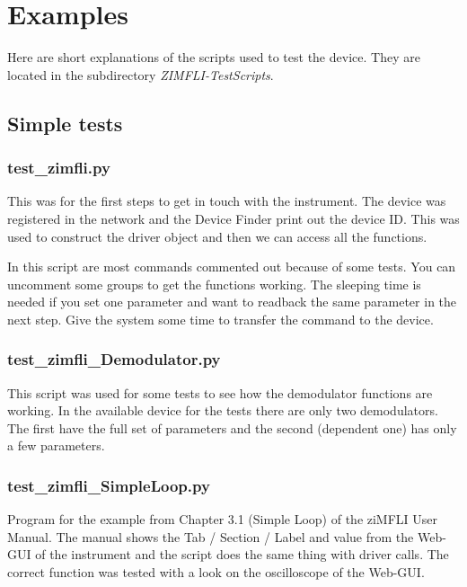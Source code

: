 \documentclass[11pt]{article} %
\begin{document}
            
            

\clearpage

\section{Examples}

Here are short explanations of the scripts used to test the device. They are located in the subdirectory {\it ZIMFLI-TestScripts}.


\subsection{Simple tests}

\subsubsection{test\_zimfli.py}
This was for the first steps to get in touch with the instrument. The device was registered in the network and the Device Finder print out the device ID. This was used to construct the driver object and then we can access all the functions.

In this script are most commands commented out because of some tests. You can uncomment some groups to get the functions working. The sleeping time is needed if you set one parameter and want to readback the same parameter in the next step. Give the system some time to transfer the command to the device.

\subsubsection{test\_zimfli\_Demodulator.py}
This script was used for some tests to see how the demodulator functions are working. In the available device for the tests there are only two demodulators. The first have the full set of parameters and the second (dependent one) has only a few parameters.

\subsubsection{test\_zimfli\_SimpleLoop.py}
Program for the example from Chapter 3.1 (Simple Loop) of the ziMFLI User Manual. The manual shows the Tab / Section / Label and value from the Web-GUI of the instrument and the script does the same thing with driver calls. The correct function was tested with a look on the oscilloscope of the Web-GUI.
\end{document}
